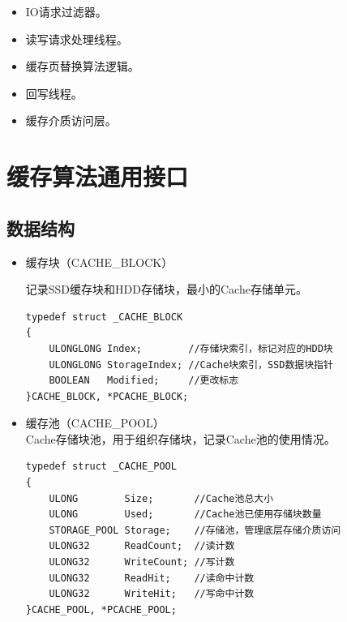 \begin{itemize}
\item IO请求过滤器。
\item 读写请求处理线程。
\item 缓存页替换算法逻辑。
\item 回写线程。
\item 缓存介质访问层。
\end{itemize}


\section{缓存算法通用接口}
\label{sec:cache_interface}

\subsection{数据结构}
\begin{itemize}

\item 缓存块（CACHE\_BLOCK）

记录SSD缓存块和HDD存储块，最小的Cache存储单元。
\begin{lstlisting}
typedef struct _CACHE_BLOCK
{
    ULONGLONG Index;        //存储块索引，标记对应的HDD块
    ULONGLONG StorageIndex; //Cache块索引，SSD数据块指针
    BOOLEAN   Modified;     //更改标志
}CACHE_BLOCK, *PCACHE_BLOCK;
\end{lstlisting}

\item 缓存池（CACHE\_POOL）
\\Cache存储块池，用于组织存储块，记录Cache池的使用情况。
\begin{lstlisting}
typedef struct _CACHE_POOL
{
    ULONG        Size;       //Cache池总大小
    ULONG        Used;       //Cache池已使用存储块数量
    STORAGE_POOL Storage;    //存储池，管理底层存储介质访问
    ULONG32      ReadCount;  //读计数
    ULONG32      WriteCount; //写计数
    ULONG32      ReadHit;    //读命中计数
    ULONG32      WriteHit;   //写命中计数
}CACHE_POOL, *PCACHE_POOL;
\end{lstlisting}

\end{itemize}

